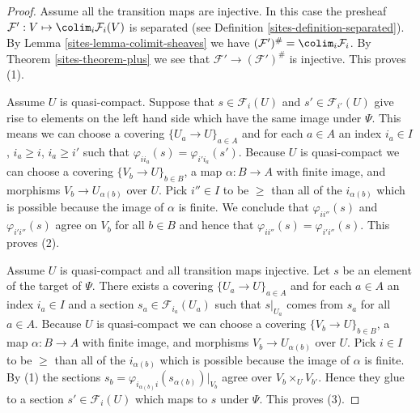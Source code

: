 \begin{proof}

Assume all the transition maps are injective. In this case the presheaf
$\mathcal{F}' : V \mapsto \colim_i \mathcal{F}_i(V)$ is
separated (see Definition \ref{sites-definition-separated}).
By Lemma \ref{sites-lemma-colimit-sheaves}
we have
$(\mathcal{F}')^\# = \colim_i \mathcal{F}_i$.
By Theorem \ref{sites-theorem-plus}
we see that $\mathcal{F}' \to (\mathcal{F}')^\#$ is injective.
This proves (1).

\medskip\noindent
Assume $U$ is quasi-compact. Suppose that $s \in \mathcal{F}_i(U)$ and
$s' \in \mathcal{F}_{i'}(U)$ give rise to elements on
the left hand side which have the same image under $\Psi$.
This means we can choose a covering $\{U_a \to U\}_{a \in A}$
and for each $a \in A$ an index $i_a \in I$, $i_a \geq i$, $i_a \geq i'$
such that $\varphi_{ii_a}(s) = \varphi_{i'i_a}(s')$.
Because $U$ is quasi-compact we can choose a covering
$\{V_b \to U\}_{b \in B}$, a map $\alpha : B \to A$ with finite image,
and morphisms $V_b \to U_{\alpha(b)}$ over $U$.
Pick $i''\in I$ to be $\geq$ than all of the $i_{\alpha(b)}$
which is possible because the image of $\alpha$ is finite.
We conclude that $\varphi_{ii''}(s)$ and $\varphi_{i'i''}(s)$
agree on $V_b$ for all $b \in B$ and hence that
$\varphi_{ii''}(s) = \varphi_{i'i''}(s)$. This proves (2).

\medskip\noindent
Assume $U$ is quasi-compact and all transition maps injective.
Let $s$ be an element of the target of $\Psi$. There exists a covering
$\{U_a \to U\}_{a \in A}$ and for each $a \in A$ an index $i_a \in I$
and a section $s_a \in \mathcal{F}_{i_a}(U_a)$
such that $s|_{U_a}$ comes from $s_a$ for all $a \in A$.
Because $U$ is quasi-compact we can choose a covering
$\{V_b \to U\}_{b \in B}$, a map $\alpha : B \to A$ with finite image,
and morphisms $V_b \to U_{\alpha(b)}$ over $U$.
Pick $i \in I$ to be $\geq$ than all of the $i_{\alpha(b)}$
which is possible because the image of $\alpha$ is finite.
By (1) the sections
$s_b = \varphi_{i_{\alpha(b)} i}(s_{\alpha(b)})|_{V_b}$
agree over $V_b \times_U V_{b'}$.
Hence they glue to a section
$s' \in \mathcal{F}_i(U)$ which maps to $s$ under $\Psi$.
This proves (3).


\end{proof}
